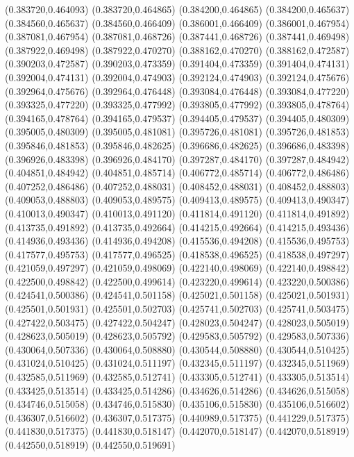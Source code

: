 (0.383720,0.464093)
(0.383720,0.464865)
(0.384200,0.464865)
(0.384200,0.465637)
(0.384560,0.465637)
(0.384560,0.466409)
(0.386001,0.466409)
(0.386001,0.467954)
(0.387081,0.467954)
(0.387081,0.468726)
(0.387441,0.468726)
(0.387441,0.469498)
(0.387922,0.469498)
(0.387922,0.470270)
(0.388162,0.470270)
(0.388162,0.472587)
(0.390203,0.472587)
(0.390203,0.473359)
(0.391404,0.473359)
(0.391404,0.474131)
(0.392004,0.474131)
(0.392004,0.474903)
(0.392124,0.474903)
(0.392124,0.475676)
(0.392964,0.475676)
(0.392964,0.476448)
(0.393084,0.476448)
(0.393084,0.477220)
(0.393325,0.477220)
(0.393325,0.477992)
(0.393805,0.477992)
(0.393805,0.478764)
(0.394165,0.478764)
(0.394165,0.479537)
(0.394405,0.479537)
(0.394405,0.480309)
(0.395005,0.480309)
(0.395005,0.481081)
(0.395726,0.481081)
(0.395726,0.481853)
(0.395846,0.481853)
(0.395846,0.482625)
(0.396686,0.482625)
(0.396686,0.483398)
(0.396926,0.483398)
(0.396926,0.484170)
(0.397287,0.484170)
(0.397287,0.484942)
(0.404851,0.484942)
(0.404851,0.485714)
(0.406772,0.485714)
(0.406772,0.486486)
(0.407252,0.486486)
(0.407252,0.488031)
(0.408452,0.488031)
(0.408452,0.488803)
(0.409053,0.488803)
(0.409053,0.489575)
(0.409413,0.489575)
(0.409413,0.490347)
(0.410013,0.490347)
(0.410013,0.491120)
(0.411814,0.491120)
(0.411814,0.491892)
(0.413735,0.491892)
(0.413735,0.492664)
(0.414215,0.492664)
(0.414215,0.493436)
(0.414936,0.493436)
(0.414936,0.494208)
(0.415536,0.494208)
(0.415536,0.495753)
(0.417577,0.495753)
(0.417577,0.496525)
(0.418538,0.496525)
(0.418538,0.497297)
(0.421059,0.497297)
(0.421059,0.498069)
(0.422140,0.498069)
(0.422140,0.498842)
(0.422500,0.498842)
(0.422500,0.499614)
(0.423220,0.499614)
(0.423220,0.500386)
(0.424541,0.500386)
(0.424541,0.501158)
(0.425021,0.501158)
(0.425021,0.501931)
(0.425501,0.501931)
(0.425501,0.502703)
(0.425741,0.502703)
(0.425741,0.503475)
(0.427422,0.503475)
(0.427422,0.504247)
(0.428023,0.504247)
(0.428023,0.505019)
(0.428623,0.505019)
(0.428623,0.505792)
(0.429583,0.505792)
(0.429583,0.507336)
(0.430064,0.507336)
(0.430064,0.508880)
(0.430544,0.508880)
(0.430544,0.510425)
(0.431024,0.510425)
(0.431024,0.511197)
(0.432345,0.511197)
(0.432345,0.511969)
(0.432585,0.511969)
(0.432585,0.512741)
(0.433305,0.512741)
(0.433305,0.513514)
(0.433425,0.513514)
(0.433425,0.514286)
(0.434626,0.514286)
(0.434626,0.515058)
(0.434746,0.515058)
(0.434746,0.515830)
(0.435106,0.515830)
(0.435106,0.516602)
(0.436307,0.516602)
(0.436307,0.517375)
(0.440989,0.517375)
(0.441229,0.517375)
(0.441830,0.517375)
(0.441830,0.518147)
(0.442070,0.518147)
(0.442070,0.518919)
(0.442550,0.518919)
(0.442550,0.519691)
